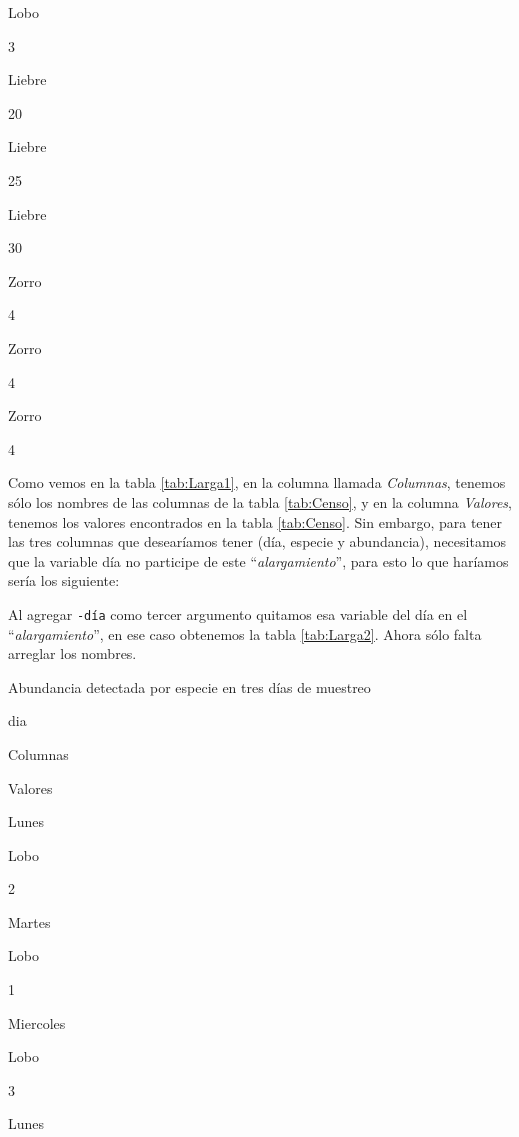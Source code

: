 \documentclass[]{book}
\newenvironment{Shaded}{\begin{snugshade}}{\end{snugshade}}
\newcommand{\DataTypeTok}[1]{\textcolor[rgb]{0.13,0.29,0.53}{#1}}
\newcommand{\KeywordTok}[1]{\textcolor[rgb]{0.13,0.29,0.53}{\textbf{#1}}}
\newcommand{\NormalTok}[1]{#1}
\newcommand{\OperatorTok}[1]{\textcolor[rgb]{0.81,0.36,0.00}{\textbf{#1}}}
\newcommand{\StringTok}[1]{\textcolor[rgb]{0.31,0.60,0.02}{#1}}
\begin{document}
Lobo

3

Liebre

20

Liebre

25

Liebre

30

Zorro

4

Zorro

4

Zorro

4

Como vemos en la tabla \ref{tab:Larga1}, en la columna llamada
\emph{Columnas}, tenemos sólo los nombres de las columnas de la tabla
\ref{tab:Censo}, y en la columna \emph{Valores}, tenemos los valores
encontrados en la tabla \ref{tab:Censo}. Sin embargo, para tener las
tres columnas que desearíamos tener (día, especie y abundancia),
necesitamos que la variable día no participe de este
``\emph{alargamiento}'', para esto lo que haríamos sería los siguiente:

\begin{Shaded}
\end{Shaded}

Al agregar \texttt{-día} como tercer argumento quitamos esa variable del
día en el ``\emph{alargamiento}'', en ese caso obtenemos la tabla
\ref{tab:Larga2}. Ahora sólo falta arreglar los nombres.

\label{tab:Larga2}Abundancia detectada por especie en tres días de muestreo

dia

Columnas

Valores

Lunes

Lobo

2

Martes

Lobo

1

Miercoles

Lobo

3

Lunes
\end{document}

